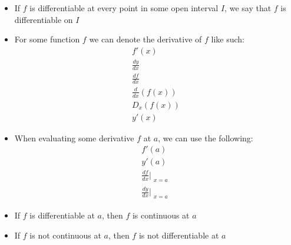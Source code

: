 \documentclass{article}
\begin{document}
\begin{itemize}
\begin{itemize}
        \item If $f$ is differentiable at every point in some open interval $I$, we say that $f$ is differentiable on $I$
        \item For some function $f$ we can denote the derivative of $f$ like such:
        \begin{eqnarray}
            f'(x) \\
            \frac{dy}{dx} \\
            \frac{df}{dx} \\
            \frac{d}{dx}(f(x)) \\
            D_x (f(x)) \\
            y'(x)
        \end{eqnarray}
        \item When evaluating some derivative $f$ at $a$, we can use the following:
        \begin{eqnarray}
            f'(a) \\
            y'(a) \\
            \frac{df}{dx}\Bigr|_{\substack{x=a}} \\
            \frac{dy}{dx}\Bigr|_{\substack{x=a}}
        \end{eqnarray}
        \item If $f$ is differentiable at $a$, then $f$ is continuous at $a$
        \item If $f$ is not continuous at $a$, then $f$ is not differentiable at $a$
    \end{itemize}
\end{itemize}
\end{document}
